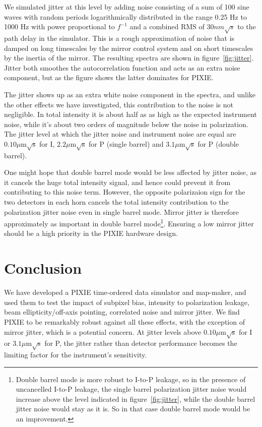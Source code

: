 \documentclass{article}
\begin{document}
We simulated jitter at this level by adding noise consisting of a
sum of 100 sine waves with random periods logarithmically distributed
in the range 0.25 Hz to 1000 Hz with power proportional to $f^{-1}$
and a combined RMS of $30 nm\sqrt{s}$ to the path delay in the simulator.
This is a rough approximation of noise that is damped on long timescales
by the mirror control system and on short timescales by the inertia of
the mirror. The resulting spectra are shown in figure~\ref{fig:jitter}.
Jitter both smoothes the autocorrelation function and acts as an extra
noise component, but as the figure shows the latter dominates for PIXIE.

The jitter shows up as an extra white noise component in the spectra,
and unlike the other effects we have investigated, this contribution to the
noise is not negligible. In total intensity it is about half as as high as
the expected instrument noise, while it's about two orders of magnitude
below the noise in polarization. The jitter level at which the jitter noise
and instrument noise are equal are $0.10 \mu\textrm{m}\sqrt{\textrm{s}}$
for I,  $2.2\mu\textrm{m}\sqrt{\textrm{s}}$ for P (single barrel) and
$3.1\mu\textrm{m}\sqrt{\textrm{s}}$ for P (double barrel).

One might hope that double barrel mode would
be less affected by jitter noise, as it cancels the huge total intensity signal, and hence
could prevent it from contributing to this noise term. However,
the opposite polarizaion sign for the two detectors in each horn cancels
the total intensity contribution to the polarization jitter noise even in
single barrel mode. Mirror jitter is therefore approximately as important in double
barrel mode\footnote{Double barrel mode is more robust to I-to-P leakage,
so in the presence of uncancelled I-to-P leakage, the single barrel polarization
jitter noise would increase above the level indicated in figure~\ref{fig:jitter},
while the double barrel jitter noise would stay as it is. So in that case double
barrel mode would be an improvement.}.
Ensuring a low mirror jitter should be a high
priority in the PIXIE hardware design.

\section{Conclusion}
We have developed a PIXIE time-ordered data simulator and map-maker,
and used them to test the impact of subpixel bias, intensity to
polarization leakage, beam ellipticity/off-axis pointing, correlated
noise and mirror jitter. We find PIXIE to be remarkably robust against
all these effects, with the exception of mirror jitter, which is a
potential concern. At jitter levels above $0.10 \mu\textrm{m}\sqrt{\textrm{s}}$
for I or $3.1\mu\textrm{m}\sqrt{\textrm{s}}$ for P, the jitter rather
than detector performance becomes the limiting factor for the instrument's sensitivity.
\end{document}
